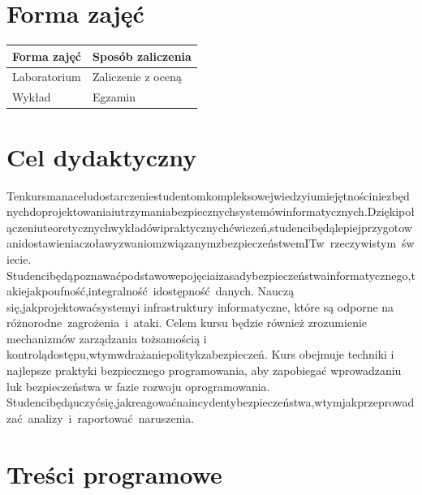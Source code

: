 \documentclass[12pt, a4paper]{article}
\begin{document}
\section{Forma zajęć}

\begin{tabular}{ll}
  \hline
  \textbf{Forma zajęć} & \textbf{Sposób zaliczenia} \\
  \hline
  Laboratorium & Zaliczenie z oceną \\
  Wykład & Egzamin \\
  \hline
\end{tabular}

\section{Cel dydaktyczny}

Tenkursmanaceludostarczeniestudentomkompleksowejwiedzyiumiejętnościniezbędnychdoprojektowaniaiutrzymaniabezpiecznychsystemówinformatycznych.Dziękipołączeniuteoretycznychwykładówipraktycznychćwiczeń,studencibędąlepiejprzygotowanidostawieniaczoławyzwaniomzwiązanymzbezpieczeństwemITw rzeczywistym świecie. Studencibędąpoznawaćpodstawowepojęciaizasadybezpieczeństwainformatycznego,takiejakpoufność,integralność idostępność danych. Nauczą się,jakprojektowaćsystemyi infrastruktury informatyczne, które są odporne na różnorodne zagrożenia i ataki. Celem kursu będzie również zrozumienie mechanizmów zarządzania tożsamością i kontrolądostępu,wtymwdrażaniepolitykzabezpieczeń. Kurs obejmuje techniki i najlepsze praktyki bezpiecznego programowania, aby zapobiegać wprowadzaniu luk bezpieczeństwa w fazie rozwoju oprogramowania. Studencibędąuczyćsię,jakreagowaćnaincydentybezpieczeństwa,wtymjakprzeprowadzać analizy i raportować naruszenia.

\section{Treści programowe}
\end{document}
